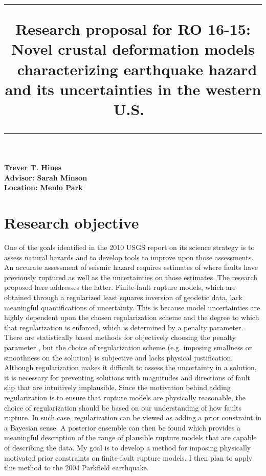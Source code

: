 \documentclass[12pt]{article}
\title{	
 \rule{\headwidth}{1.0pt}
 \raggedright
 \textbf{Research proposal for RO 16-15:
 Novel crustal deformation models \
 characterizing earthquake hazard and its uncertainties in the western U.S.}\
 \rule{\headwidth}{1.0pt}
 \date{}
 \vspace{-8ex}}
\begin{document}
 \maketitle
{\raggedright \large 
 \textbf{Trever T. Hines} \hfill\\
 \textbf{Advisor: Sarah Minson}\hfill\\
 \textbf{Location: Menlo Park}\hfill\\}

\section*{Research objective}

One of the goals identified in the 2010 USGS report on its science strategy is to assess natural hazards and to develop tools to improve upon those assessments.  An accurate assessment of seismic hazard requires estimates of where faults have previously ruptured as well as the uncertainties on those estimates.  The research proposed here addresses the latter. Finite-fault rupture models, which are obtained through a regularized least squares inversion of geodetic data, lack meaningful quantifications of uncertainty. This is because model uncertainties are highly dependent upon the chosen regularization scheme and the degree to which that regularization is enforced, which is determined by a penalty parameter. There are statistically based methods for objectively choosing the penalty parameter \citep[e.g.][]{Yabuki1992,Fukuda2008}, but the choice of regularization scheme (e.g. imposing smallness or smoothness on the solution) is subjective and lacks physical justification.  Although regularization makes it difficult to assess the uncertainty in a solution, it is necessary for preventing solutions with magnitudes and directions of fault slip that are intuitively implausible. Since the motivation behind adding regularization is to ensure that rupture models are physically reasonable, the choice of regularization should be based on our understanding of how faults rupture.  In such case, regularization can be viewed as adding a prior constraint in a Bayesian sense. A posterior ensemble can then be found which provides a meaningful description of the range of plausible rupture models that are capable of describing the data.  My goal is to develop a method for imposing physically motivated prior constraints on finite-fault rupture models. I then plan to apply this method to the 2004 Parkfield earthquake.  
\end{document}
